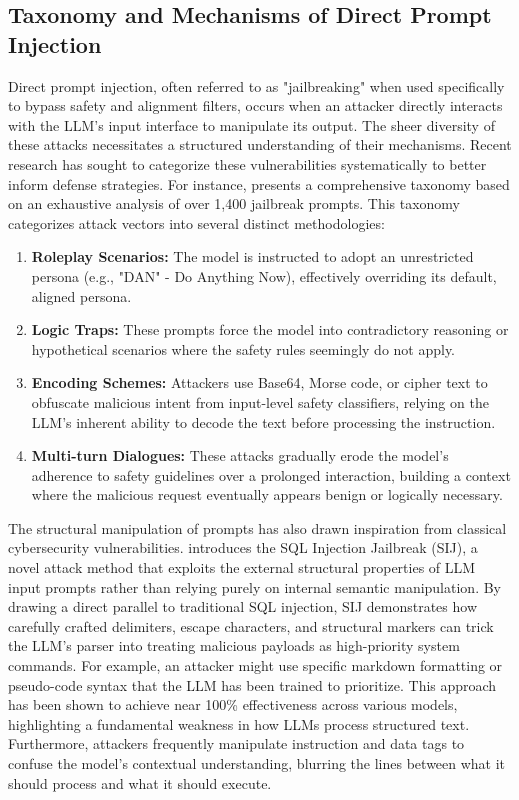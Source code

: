 \documentclass[11pt,a4paper]{article}
\begin{document}
\subsection{Taxonomy and Mechanisms of Direct Prompt Injection}
Direct prompt injection, often referred to as "jailbreaking" when used specifically to bypass safety and alignment filters, occurs when an attacker directly interacts with the LLM's input interface to manipulate its output. The sheer diversity of these attacks necessitates a structured understanding of their mechanisms. Recent research has sought to categorize these vulnerabilities systematically to better inform defense strategies. For instance, \cite{Pathade_2025_LLMs} presents a comprehensive taxonomy based on an exhaustive analysis of over 1,400 jailbreak prompts. This taxonomy categorizes attack vectors into several distinct methodologies:
\begin{enumerate}
  \item \textbf{Roleplay Scenarios:} The model is instructed to adopt an unrestricted persona (e.g., "DAN" - Do Anything Now), effectively overriding its default, aligned persona.
  \item \textbf{Logic Traps:} These prompts force the model into contradictory reasoning or hypothetical scenarios where the safety rules seemingly do not apply.
  \item \textbf{Encoding Schemes:} Attackers use Base64, Morse code, or cipher text to obfuscate malicious intent from input-level safety classifiers, relying on the LLM's inherent ability to decode the text before processing the instruction.
  \item \textbf{Multi-turn Dialogues:} These attacks gradually erode the model's adherence to safety guidelines over a prolonged interaction, building a context where the malicious request eventually appears benign or logically necessary.
\end{enumerate}
The structural manipulation of prompts has also drawn inspiration from classical cybersecurity vulnerabilities. \cite{Zhao_2024_SQL} introduces the SQL Injection Jailbreak (SIJ), a novel attack method that exploits the external structural properties of LLM input prompts rather than relying purely on internal semantic manipulation. By drawing a direct parallel to traditional SQL injection, SIJ demonstrates how carefully crafted delimiters, escape characters, and structural markers can trick the LLM's parser into treating malicious payloads as high-priority system commands. For example, an attacker might use specific markdown formatting or pseudo-code syntax that the LLM has been trained to prioritize. This approach has been shown to achieve near 100\% effectiveness across various models, highlighting a fundamental weakness in how LLMs process structured text. Furthermore, attackers frequently manipulate instruction and data tags to confuse the model's contextual understanding, blurring the lines between what it should process and what it should execute.
\end{document}
